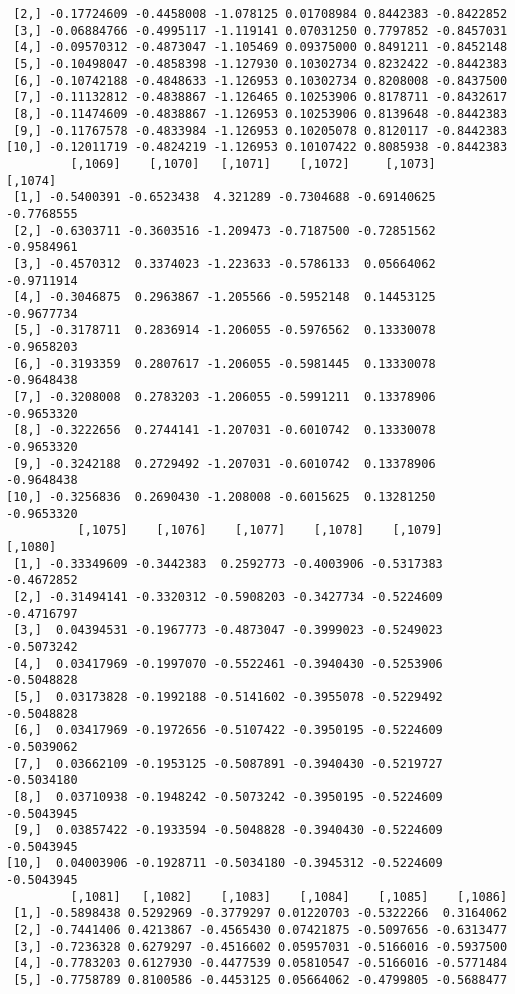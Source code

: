 \documentclass[
  letterpaper,
  DIV=11,
  numbers=noendperiod]{scrreprt}
\begin{document}
\begin{verbatim}
 [2,] -0.17724609 -0.4458008 -1.078125 0.01708984 0.8442383 -0.8422852
 [3,] -0.06884766 -0.4995117 -1.119141 0.07031250 0.7797852 -0.8457031
 [4,] -0.09570312 -0.4873047 -1.105469 0.09375000 0.8491211 -0.8452148
 [5,] -0.10498047 -0.4858398 -1.127930 0.10302734 0.8232422 -0.8442383
 [6,] -0.10742188 -0.4848633 -1.126953 0.10302734 0.8208008 -0.8437500
 [7,] -0.11132812 -0.4838867 -1.126465 0.10253906 0.8178711 -0.8432617
 [8,] -0.11474609 -0.4838867 -1.126953 0.10253906 0.8139648 -0.8442383
 [9,] -0.11767578 -0.4833984 -1.126953 0.10205078 0.8120117 -0.8442383
[10,] -0.12011719 -0.4824219 -1.126953 0.10107422 0.8085938 -0.8442383
         [,1069]    [,1070]   [,1071]    [,1072]     [,1073]    [,1074]
 [1,] -0.5400391 -0.6523438  4.321289 -0.7304688 -0.69140625 -0.7768555
 [2,] -0.6303711 -0.3603516 -1.209473 -0.7187500 -0.72851562 -0.9584961
 [3,] -0.4570312  0.3374023 -1.223633 -0.5786133  0.05664062 -0.9711914
 [4,] -0.3046875  0.2963867 -1.205566 -0.5952148  0.14453125 -0.9677734
 [5,] -0.3178711  0.2836914 -1.206055 -0.5976562  0.13330078 -0.9658203
 [6,] -0.3193359  0.2807617 -1.206055 -0.5981445  0.13330078 -0.9648438
 [7,] -0.3208008  0.2783203 -1.206055 -0.5991211  0.13378906 -0.9653320
 [8,] -0.3222656  0.2744141 -1.207031 -0.6010742  0.13330078 -0.9653320
 [9,] -0.3242188  0.2729492 -1.207031 -0.6010742  0.13378906 -0.9648438
[10,] -0.3256836  0.2690430 -1.208008 -0.6015625  0.13281250 -0.9653320
          [,1075]    [,1076]    [,1077]    [,1078]    [,1079]    [,1080]
 [1,] -0.33349609 -0.3442383  0.2592773 -0.4003906 -0.5317383 -0.4672852
 [2,] -0.31494141 -0.3320312 -0.5908203 -0.3427734 -0.5224609 -0.4716797
 [3,]  0.04394531 -0.1967773 -0.4873047 -0.3999023 -0.5249023 -0.5073242
 [4,]  0.03417969 -0.1997070 -0.5522461 -0.3940430 -0.5253906 -0.5048828
 [5,]  0.03173828 -0.1992188 -0.5141602 -0.3955078 -0.5229492 -0.5048828
 [6,]  0.03417969 -0.1972656 -0.5107422 -0.3950195 -0.5224609 -0.5039062
 [7,]  0.03662109 -0.1953125 -0.5087891 -0.3940430 -0.5219727 -0.5034180
 [8,]  0.03710938 -0.1948242 -0.5073242 -0.3950195 -0.5224609 -0.5043945
 [9,]  0.03857422 -0.1933594 -0.5048828 -0.3940430 -0.5224609 -0.5043945
[10,]  0.04003906 -0.1928711 -0.5034180 -0.3945312 -0.5224609 -0.5043945
         [,1081]   [,1082]    [,1083]    [,1084]    [,1085]    [,1086]
 [1,] -0.5898438 0.5292969 -0.3779297 0.01220703 -0.5322266  0.3164062
 [2,] -0.7441406 0.4213867 -0.4565430 0.07421875 -0.5097656 -0.6313477
 [3,] -0.7236328 0.6279297 -0.4516602 0.05957031 -0.5166016 -0.5937500
 [4,] -0.7783203 0.6127930 -0.4477539 0.05810547 -0.5166016 -0.5771484
 [5,] -0.7758789 0.8100586 -0.4453125 0.05664062 -0.4799805 -0.5688477

\end{verbatim}
\end{document}
